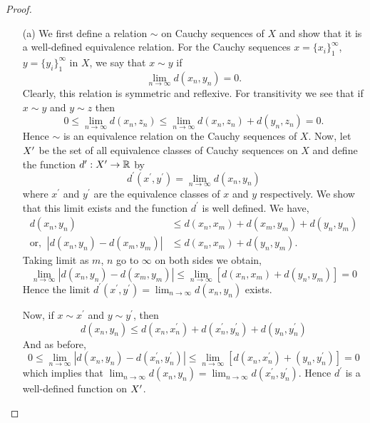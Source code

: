 \begin{solution}
\begin{proof}
        \vspace*{2mm}
        \begin{enumerate}
            \item[(a)] We first define a relation $\sim$ on Cauchy
                sequences of $X$ and show that it is a
                well-defined equivalence relation. For 
                the Cauchy sequences
                $x= \{x_i\}_1^\infty$,
                $y= \{y_i\}_1^\infty$ in $X$, we
                say that $x \sim y$ if
                $$\lim_{n\to\infty}{d(x_n,y_n)}=0.$$
                Clearly, this relation is symmetric and
                reflexive. For transitivity we see that
                if $x\sim y$ and $y\sim z$ then
                $$0\leq\lim_{n\to\infty}{d(x_n,z_n)}\leq
                \lim_{n\to\infty}{d(x_n,z_n) +d(y_n,z_n)}
                =0.$$
                Hence $\sim$ is an equivalence relation on the
                Cauchy sequences of $X$. Now, let $X^\prime$ be the
                set of all equivalence classes of Cauchy
                sequences on $X$ and define the function
                $d^\prime:X^\prime\to \mathbb{R}$ by 
                $$d^\prime(x^\prime,y^\prime)=
                \lim_{n\to\infty}{d(x_n,y_n)}$$
                    where $x^\prime$ and $y^\prime$ are the equivalence
                    classes of $x$ and $y$ respectively. We show that this
                    limit exists and the function $d^\prime$ is well
                    defined. We have,
                    \begin{align*}
                        d(x_n,y_n)&\leq d(x_n,x_m)+d(x_m,y_m)
                        +d(y_n,y_m)\\
                        \text{or, }\ |d(x_n,y_n)-d(x_m,y_m)|
                        &\leq d(x_n,x_m)+d(y_n,y_m).
                    \end{align*}
                    Taking limit as $m$, $n$ go to $\infty$
                    on both sides we obtain,
                    $$\lim_{n\to\infty}{|d(x_n,y_n)-d(x_m,y_m)|}
                    \leq \lim_{n\to\infty}{\left[d(x_n,x_m)+
                    d(y_n,y_m)\right]}=0$$
                    Hence the limit $d^\prime(x^\prime,y^\prime)=
                    \lim_{n\to\infty}{d(x_n,y_n)}$ exists.
            
                    \vspace*{3mm}
                    Now, if $x\sim x^\prime$ and $y\sim y^\prime$, then
                    $$d(x_n,y_n)\leq d(x_n,x^\prime_n)+
                    d(x_n^\prime,y_n^\prime)
                    +d(y_n,y_n^\prime)$$
                    And as before,
                    $$0\leq \lim_{n\to\infty}{|d(x_n,y_n)-
                    d(x_n^\prime,y_n^\prime)|}
                    \leq \lim_{n\to\infty}{\left[d(x_n,x^\prime_n)+
                    (y_n,y_n^\prime)\right]}=0$$
                    which implies that $\lim_{n\to\infty}{d(x_n,y_n)}
                    =\lim_{n\to\infty}{d(x_n^\prime,y_n^\prime)}$.
                    Hence $d^\prime$ is a well-defined function on
                    $X^\prime$.
            

\end{enumerate}
\end{proof}
\end{solution}
